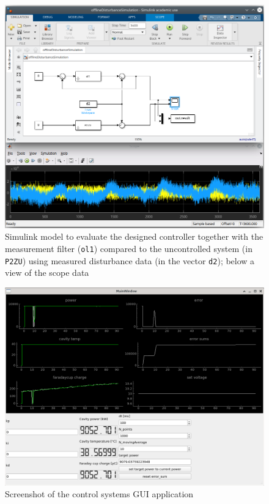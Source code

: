 \begin{figure}[tb]
	\centering
	\includegraphics[width=\textwidth]{chap/Appendix/ControllerDesign/simulink}
	\caption{Simulink model to evaluate the designed controller together with the measurement filter (\texttt{ol1}) compared to the uncontrolled system (in \texttt{P2ZU}) using measured disturbance data (in the vector \texttt{d2}); below a view of the scope data}
	\label{fig:Appendix-simuliunk}
\end{figure}

\begin{figure}[tb]
	\centering
	\includegraphics[width=\textwidth]{chap/Appendix/ControllerDesign/qt}
	\caption{Screenshot of the control systems GUI application}
	\label{fig:Appendix-qt}
\end{figure}